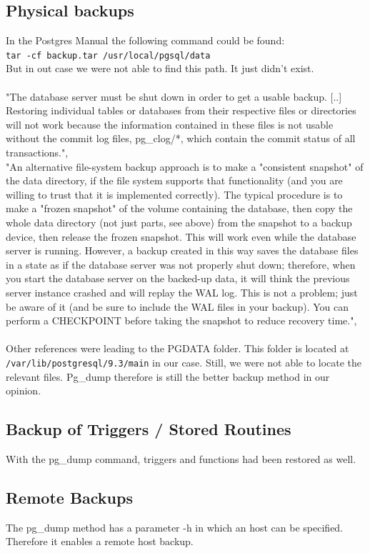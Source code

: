 \documentclass[10pt]{article}
\begin{document}
\subsection{Physical backups}
In the Postgres Manual the following command could be found: \\
\texttt{tar -cf backup.tar /usr/local/pgsql/data} \\
But in out case we were not able to find this path. It just didn't exist.
\\ \\
"The database server must be shut down in order to get a usable backup. [..] Restoring individual tables or databases from their respective files or directories will not work because the information contained in these files is not usable without the commit log files, pg\_clog/*, which contain the commit status of all transactions.",\cite{phyback} \\
"An alternative file-system backup approach is to make a "consistent snapshot" of the data directory, if the file system supports that functionality (and you are willing to trust that it is implemented correctly). The typical procedure is to make a "frozen snapshot" of the volume containing the database, then copy the whole data directory (not just parts, see above) from the snapshot to a backup device, then release the frozen snapshot. This will work even while the database server is running. However, a backup created in this way saves the database files in a state as if the database server was not properly shut down; therefore, when you start the database server on the backed-up data, it will think the previous server instance crashed and will replay the WAL log. This is not a problem; just be aware of it (and be sure to include the WAL files in your backup). You can perform a CHECKPOINT before taking the snapshot to reduce recovery time.",\cite{phyback}
\\ \\
Other references were leading to the PGDATA folder. This folder is located at \texttt{/var/lib/postgresql/9.3/main} in our case. Still, we were not able to locate the relevant files. Pg\_dump therefore is still the better backup method in our opinion.
\subsection{Backup of Triggers / Stored Routines}
With the pg\_dump command, triggers and functions had been restored as well.
\subsection{Remote Backups}
The pg\_dump method has a parameter -h in which an host can be specified. Therefore it enables a remote host backup.
\end{document}
